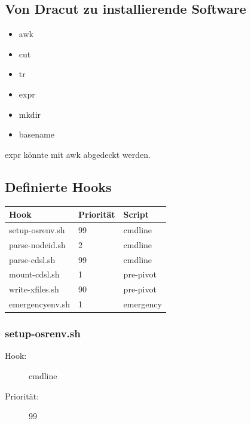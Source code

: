 \documentclass[10pt,a4paper]{article}
\begin{document}
\subsection{Von Dracut zu installierende Software}

\begin{itemize}
 \item awk
 \item cut
 \item tr
 \item expr
 \item mkdir
 \item basename
\end{itemize}

expr könnte mit awk abgedeckt werden.

\subsection{Definierte Hooks}

\begin{tabular}{|l|l|l|}
 \hline
\textbf{Hook} & \textbf{Priorität} & \textbf{Script} \\ \hline
setup-osrenv.sh  & 99 & cmdline \\ \hline
parse-nodeid.sh  & 2 & cmdline \\ \hline
parse-cdsl.sh & 99 & cmdline \\ \hline
mount-cdsl.sh & 1 & pre-pivot \\ \hline
write-xfiles.sh & 90 & pre-pivot \\ \hline
emergencyenv.sh & 1 & emergency \\ \hline
\end{tabular} 

\subsubsection{setup-osrenv.sh}
\begin{description}
\item[Hook:] cmdline
\item[Priorität:] 99
\end{description}
\end{document}
